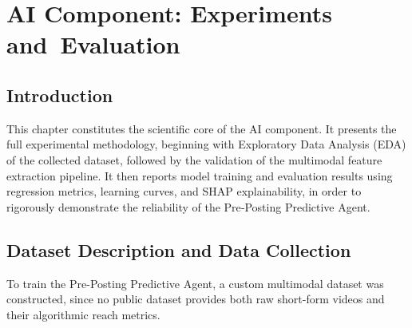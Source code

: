 \chapter[AI Component: Experiments and Evaluation]{AI Component: Experiments and~Evaluation}

\section*{Introduction}
{}
This chapter constitutes the scientific core of the AI component. It presents the full experimental methodology, beginning with Exploratory Data Analysis (EDA) of the collected dataset, followed by the validation of the multimodal feature extraction pipeline. It then reports model training and evaluation results using regression metrics, learning curves, and SHAP explainability, in order to rigorously demonstrate the reliability of the Pre‑Posting Predictive Agent.

\section{Dataset Description and Data Collection}
To train the Pre-Posting Predictive Agent, a custom multimodal dataset was constructed, since no public dataset provides both raw short-form videos and their algorithmic reach metrics.

